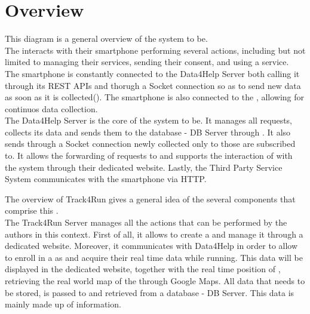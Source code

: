 \documentclass[../../DD.tex]{subfiles}
\begin{document}
\section{Overview}

	This diagram is a general overview of the system to be.\\
	The  interacts with their smartphone performing several actions, including but not limited to managing their services, sending their consent, and using a service. The smartphone is constantly connected to the Data4Help Server both calling it through its REST APIs and thorugh a Socket connection so as to send new data as soon as it is collected(). The smartphone is also connected to the , allowing for continuos data collection.\\
	The Data4Help Server is the core of the system to be. It manages all  requests, collects its data and sends them to the database - DB Server through . It also sends through a Socket connection newly collected  only to those  are subscribed to. It allows the forwarding of  requests to  and supports the interaction of  with the system through their dedicated website.
	Lastly, the Third Party Service System communicates with the  smartphone via HTTP. 



	



	The overview of Track4Run gives a general idea of the several components that comprise this .\\
	The Track4Run Server manages all the actions that can be performed by the authors in this context. First of all, it allows  to create a  and manage it through a dedicated website. Moreover, it communicates with Data4Help in order to allow  to enroll in a  as  and acquire their real time data while running. This data will be displayed in the dedicated  website, together with the real time position of , retrieving the real world map of the  through Google Maps. All data that needs to be stored, is passed to and retrieved from a database - DB Server. This data is mainly made up of  information.

	

	
\end{document}
